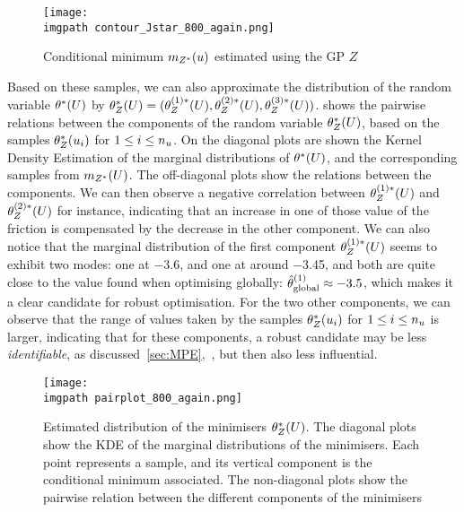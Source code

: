 \documentclass[../../Main_ManuscritThese.tex]{subfiles}
\newcommand\imgpath{/home/victor/acadwriting/Manuscrit/Text/Chapter5/img/}
\begin{document}
\begin{figure}[ht]
 \centering
 \texttt{[image: \\imgpath contour\_Jstar\_800\_again.png]}
 \caption{\label{fig:contour_Jstar} Conditional minimum $m_{Z^*}(u)$
   estimated using the GP $Z$}
\end{figure}
Based on these samples, we can also approximate the distribution of
the random variable $\kk^*(\UU)$ by
$\theta_Z^*(U) = (\theta^{(1) *}_Z(U), \theta^{(2) *}_Z(U), \theta^{(3)
  *}_Z(U))$.   shows the pairwise relations
between the components of the random variable $\theta^*_Z(U)$, based on
the samples $\theta^*_Z(u_i)$ for $1\leq i \leq n_{u}$. On the
diagonal plots are shown the Kernel Density Estimation of the marginal
distributions of $\kk^*(\UU)$, and the corresponding samples from
$m_{Z^*}(U)$. The off-diagonal plots show the relations between the
components. We can then observe a negative correlation between
$\theta^{(1) *}_Z(U)$ and $\theta^{(2) *}_Z(U)$ for instance, indicating
that an increase in one of those value of the friction is compensated
by the decrease in the other component.  We can also notice that the
marginal distribution of the first component $\theta_Z^{(1)*}(U)$ seems
to exhibit two modes: one at \num{-3.6}, and one at around
\num{-3.45}, and both are quite close to the value found when
optimising globally:
$\hat{\theta}^{(1)}_{\mathrm{global}}\approx \num{-3.5}$, which makes it
a clear candidate for robust optimisation. For the two other
components, we can observe that the range of values taken by the
samples $\theta^*_Z(u_i)$ for $1 \leq i \leq n_{u}$ is larger,
indicating that for these components, a robust candidate may be less
\emph{identifiable}, as discussed~\cref{sec:MPE},~,
but then also less influential.

\begin{figure}[ht]
  \centering
  \texttt{[image: \\imgpath pairplot\_800\_again.png]}
  \caption[Distribution of the minimisers
  $\kk^*(\UU)$]{\label{fig:pairplot} Estimated distribution of the
    minimisers $\theta^*_Z(U)$. The diagonal plots show the KDE of the
    marginal distributions of the minimisers. Each point represents a
    sample, and its vertical component is the conditional minimum
    associated. The non-diagonal plots show the pairwise relation
    between the different components of the minimisers }
\end{figure}

\clearpage
\end{document}
